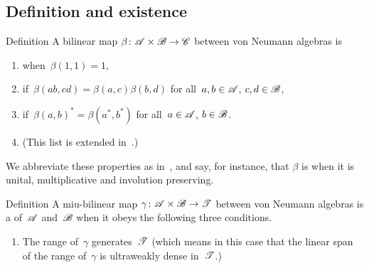 \documentclass[a]{subfiles}
\begin{document}
\subsection{Definition and existence}
\begin{parsec}%
\begin{point}{Definition}%
A bilinear map $\beta\colon \mathscr{A}\times \mathscr{B}\to\mathscr{C}$
between von Neumann algebras is
\begin{enumerate}
\item
{}
when~$\beta(1,1)=1$,
\item
{}
if~$\beta(ab,cd)=\beta(a,c)\beta(b,d)$
for all~$a,b\in\mathscr{A}$, $c,d\in\mathscr{B}$,
\item
{}
if~$\beta(a,b)^*=\beta(a^*,b^*)$
for all~$a\in\mathscr{A}$, $b\in\mathscr{B}$.
\item
(This list is extended in~.)
\end{enumerate}
We abbreviate these properties as in~,
and say, for instance, that $\beta$ is 
when it is unital, multiplicative and involution preserving.

\end{point}
\begin{point}[tensor]{Definition}%
A miu-bilinear map $\gamma\colon \mathscr{A}\times\mathscr{B}\to\mathscr{T}$
between von Neumann algebras
is a  
of~$\mathscr{A}$ and~$\mathscr{B}$
when it obeys the following three conditions.
\begin{enumerate}
\item
\label{tensor-1}
The range of~$\gamma$ generates~$\mathscr{T}$
(which  means in this case that the linear span
of the range of~$\gamma$ is ultraweakly dense in~$\mathscr{T}$.)


\end{enumerate}
\end{point}
\end{parsec}
\end{document}
